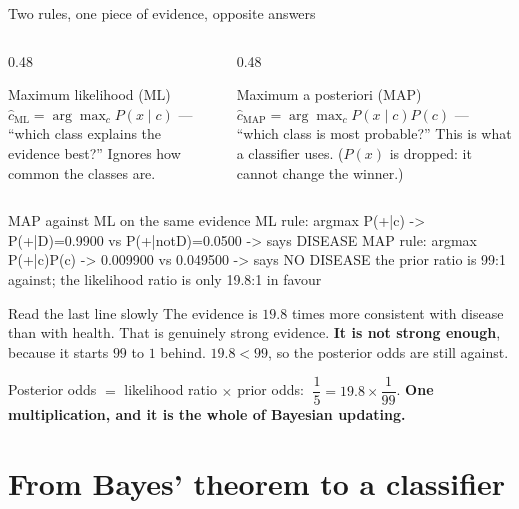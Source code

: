 \documentclass[aspectratio=169]{beamer}
\begin{document}
\begin{frame}[fragile,shrink=9]{Two rules, one piece of evidence, opposite
answers}
\begin{columns}[T]
  \begin{column}{0.48\textwidth}
    \begin{block}{Maximum likelihood (ML)}
      \small $\hat{c}_{\text{ML}} = \arg\max_{c} P(x \mid c)$ ---
      ``which class explains the evidence best?'' Ignores how common the
      classes are.
    \end{block}
  \end{column}
  \begin{column}{0.48\textwidth}
    \begin{block}{Maximum a posteriori (MAP)}
      \small $\hat{c}_{\text{MAP}} = \arg\max_{c} P(x \mid c)P(c)$ ---
      ``which class is most probable?'' This is what a classifier uses.
      ($P(x)$ is dropped: it cannot change the winner.)
    \end{block}
  \end{column}
\end{columns}
\vspace{0.2em}
\begin{outblk}
MAP against ML on the same evidence
   ML  rule: argmax P(+|c)      -> P(+|D)=0.9900 vs P(+|notD)=0.0500  -> says DISEASE
   MAP rule: argmax P(+|c)P(c)  -> 0.009900 vs 0.049500  -> says NO DISEASE
   the prior ratio is 99:1 against; the likelihood ratio is only 19.8:1 in favour
\end{outblk}
\begin{alertblock}{Read the last line slowly}
  \footnotesize The evidence is $19.8$ times more consistent with disease
  than with health. That is genuinely strong evidence. \textbf{It is not
  strong enough}, because it starts $99$ to $1$ behind.
  $19.8 < 99$, so the posterior odds are still against.
\end{alertblock}
\begin{center}\small
  Posterior odds $=$ likelihood ratio $\times$ prior odds:
  $\;\dfrac{1}{5} = 19.8 \times \dfrac{1}{99}$.
  \textbf{One multiplication, and it is the whole of Bayesian updating.}
\end{center}
\end{frame}

\section[Naive assumption]{From Bayes' theorem to a classifier}
\label{sec:naive}
\end{document}

